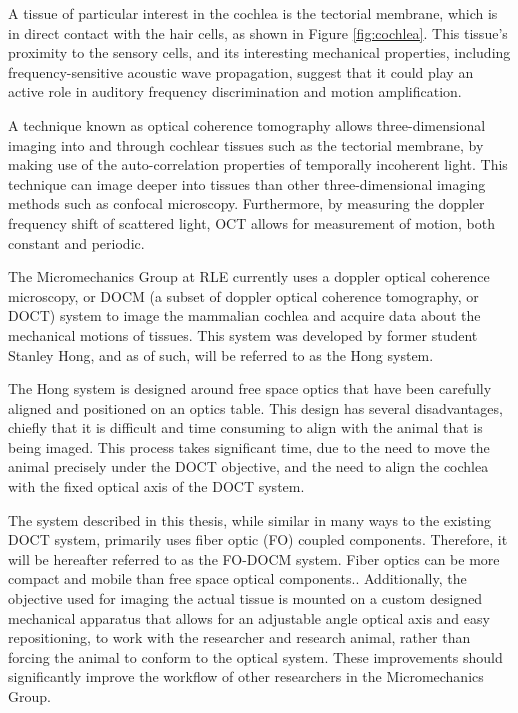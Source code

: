 A tissue of particular interest in the cochlea is the tectorial membrane, which is in direct contact with the hair cells, as shown in Figure \ref{fig:cochlea}. This tissue's proximity to the sensory cells, and its interesting mechanical properties, including frequency-sensitive acoustic wave propagation, suggest that it could play an active role in auditory frequency discrimination and motion amplification. \cite{Ghaffari2010}


A technique known as optical coherence tomography allows three-dimensional imaging into and through cochlear tissues such as the tectorial membrane, by making use of the auto-correlation properties of temporally incoherent light. This technique can image deeper into tissues than other three-dimensional imaging methods such as confocal microscopy. Furthermore, by measuring the doppler frequency shift of scattered light, OCT allows for measurement of motion, both constant and periodic. \cite{DrexlerBook}

The Micromechanics Group at RLE currently uses a doppler optical coherence microscopy, or DOCM (a subset of doppler optical coherence tomography, or DOCT) system to image the mammalian cochlea and acquire data about the mechanical motions of tissues. This system was developed by former student Stanley Hong, and as of such, will be referred to as the Hong system. \cite{hong}

The Hong system is designed around free space optics that have been carefully aligned and positioned on an optics table. This design has several disadvantages, chiefly that it is difficult and time consuming to align with the animal that is being imaged. This process takes significant time, due to the need to move the animal precisely under the DOCT objective, and the need to align the cochlea with the fixed optical axis of the DOCT system.

The system described in this thesis, while similar in many ways to the existing DOCT system, primarily uses fiber optic (FO) coupled components. Therefore, it will be hereafter referred to as the FO-DOCM system. Fiber optics can be more compact and mobile than free space optical components.. Additionally, the objective used for imaging the actual tissue is mounted on a custom designed mechanical apparatus that allows for an adjustable angle optical axis and easy repositioning, to work with the researcher and research animal, rather than forcing the animal to conform to the optical system. These improvements should significantly improve the workflow of other researchers in the Micromechanics Group.

